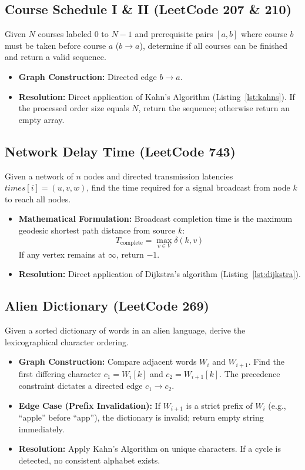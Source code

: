 \documentclass[10pt,journal,compsoc,onecolumn]{IEEEtran}
\begin{document}
\subsection{Course Schedule I \& II (LeetCode 207 \& 210)}
Given $N$ courses labeled $0$ to $N-1$ and prerequisite pairs $[a, b]$ where course $b$ must be taken before course $a$ ($b \to a$), determine if all courses can be finished and return a valid sequence.
\begin{itemize}
    \item \textbf{Graph Construction:} Directed edge $b \to a$.
    \item \textbf{Resolution:} Direct application of Kahn's Algorithm (Listing~\ref{lst:kahns}). If the processed order size equals $N$, return the sequence; otherwise return an empty array.
\end{itemize}

\subsection{Network Delay Time (LeetCode 743)}
Given a network of $n$ nodes and directed transmission latencies $times[i] = (u, v, w)$, find the time required for a signal broadcast from node $k$ to reach all nodes.
\begin{itemize}
    \item \textbf{Mathematical Formulation:} Broadcast completion time is the maximum geodesic shortest path distance from source $k$:
    \begin{equation}
    T_{\text{complete}} = \max_{v \in V} \delta(k, v)
    \end{equation}
    If any vertex remains at $\infty$, return $-1$.
    \item \textbf{Resolution:} Direct application of Dijkstra's algorithm (Listing~\ref{lst:dijkstra}).
\end{itemize}

\subsection{Alien Dictionary (LeetCode 269)}
Given a sorted dictionary of words in an alien language, derive the lexicographical character ordering.
\begin{itemize}
    \item \textbf{Graph Construction:} Compare adjacent words $W_i$ and $W_{i+1}$. Find the first differing character $c_1 = W_i[k]$ and $c_2 = W_{i+1}[k]$. The precedence constraint dictates a directed edge $c_1 \to c_2$.
    \item \textbf{Edge Case (Prefix Invalidation):} If $W_{i+1}$ is a strict prefix of $W_i$ (e.g., ``apple'' before ``app''), the dictionary is invalid; return empty string immediately.
    \item \textbf{Resolution:} Apply Kahn's Algorithm on unique characters. If a cycle is detected, no consistent alphabet exists.
\end{itemize}
\end{document}
